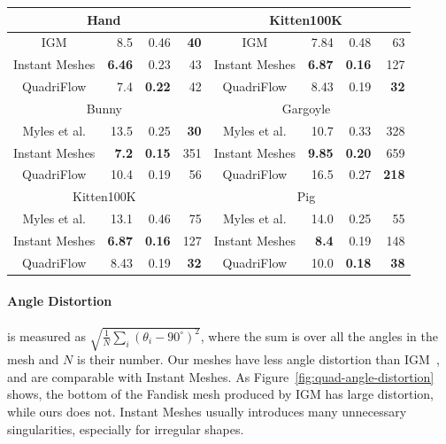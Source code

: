 \begin{table}
\begin{tabular}{|c|r|r|r|c|r|r|r|}
\hline
\multicolumn{4}{|c|}{Hand~\cite{bommes2013integer}}  & \multicolumn{4}{c|}{Kitten100K~\cite{bommes2013integer}}  \\
\hline
IGM & 8.5 & 0.46 & \textbf{40} & IGM & 7.84 & 0.48 & 63 \\
\hline
Instant Meshes & \textbf{6.46} & 0.23 & 43 & Instant Meshes & \textbf{6.87} & \textbf{0.16} & 127 \\
\hline
QuadriFlow & 7.4 & \textbf{0.22} & 42 & QuadriFlow & 8.43 & 0.19 & \textbf{32} \\
\hline
\multicolumn{4}{|c|}{Bunny~\cite{myles2014robust}} & \multicolumn{4}{c|}{Gargoyle~\cite{myles2014robust}}  \\
\hline
Myles et al. & 13.5 & 0.25 & \textbf{30} & Myles et al. & 10.7 & 0.33 & 328 \\
\hline
Instant Meshes & \textbf{7.2} & \textbf{0.15} & 351 & Instant Meshes & \textbf{9.85} & \textbf{0.20} & 659 \\
\hline
QuadriFlow & 10.4 & 0.19 & 56 & QuadriFlow & 16.5 & 0.27 & \textbf{218} \\
\hline
\multicolumn{4}{|c|}{Kitten100K~\cite{myles2014robust}}  & \multicolumn{4}{c|}{Pig~\cite{myles2014robust}}  \\
\hline
Myles et al. & 13.1 & 0.46 & 75 & Myles et al. & 14.0 & 0.25 & 55 \\
\hline
Instant Meshes & \textbf{6.87} & \textbf{0.16} & 127 & Instant Meshes & \textbf{8.4} & 0.19 & 148 \\
\hline
QuadriFlow & 8.43 & 0.19 & \textbf{32} & QuadriFlow & 10.0 & \textbf{0.18} & \textbf{38} \\
\hline
\end{tabular}
\end{table}

\paragraph*{Angle Distortion} is measured as $\sqrt{\frac{1}{N}\sum_{i}(\theta_i-90^\circ)^2}$, where the sum is over all the angles in the mesh and $N$ is their number. Our meshes have less angle distortion than IGM~\cite{bommes2013integer}, and are comparable with Instant Meshes. As Figure~\ref{fig:quad-angle-distortion} shows, the bottom of the Fandisk mesh produced by IGM has large distortion, while ours does not. Instant Meshes usually introduces many unnecessary singularities, especially for irregular shapes.

